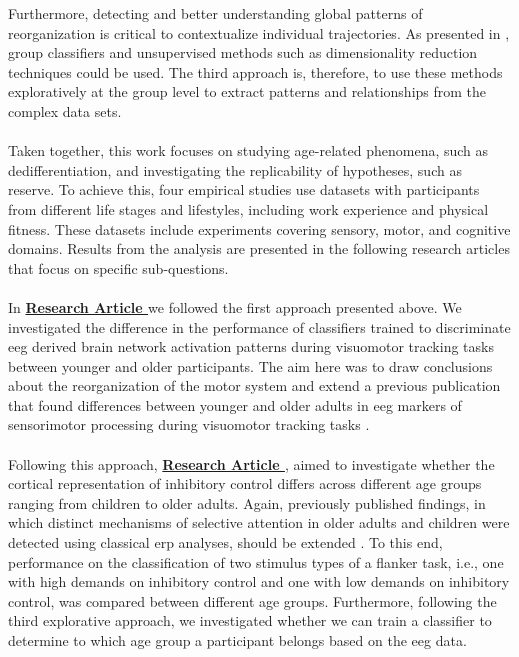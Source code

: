 Furthermore, detecting and better understanding global patterns of reorganization is critical to contextualize individual trajectories. As presented in , group classifiers and unsupervised methods such as dimensionality reduction techniques could be used. The third approach is, therefore, to use these methods exploratively at the group level to extract patterns and relationships from the complex data sets.\\
\\
Taken together, this work focuses on studying age-related phenomena, such as dedifferentiation, and investigating the replicability of hypotheses, such as reserve. To achieve this, four empirical studies use datasets with participants from different life stages and lifestyles, including work experience and physical fitness. These datasets include experiments covering sensory, motor, and cognitive domains. Results from the analysis are presented in the following research articles that focus on specific sub-questions.\\
\\
In \textbf{\hyperref[pub:paperI]{Research Article }} we followed the first approach presented above. We investigated the difference in the performance of classifiers trained to discriminate \gls{eeg} derived brain network activation patterns during visuomotor tracking tasks between younger and older participants. The aim here was to draw conclusions about the reorganization of the motor system and extend a previous publication that found differences between younger and older adults in \gls{eeg} markers of sensorimotor processing during visuomotor tracking tasks \cite{Vieluf2018}.\\
\\
Following this approach, \textbf{\hyperref[pub:paperII]{Research Article }}, aimed to investigate whether the cortical representation of inhibitory control differs across different age groups ranging from children to older adults. Again, previously published findings, in which distinct mechanisms of selective attention in older adults and children were detected using classical \gls{erp} analyses, should be extended \cite{Reuter2019}. To this end, performance on the classification of two stimulus types of a flanker task, i.e., one with high demands on inhibitory control and one with low demands on inhibitory control, was compared between different age groups. Furthermore, following the third explorative approach, we investigated whether we can train a classifier to determine to which age group a participant belongs based on the \gls{eeg} data.\\
